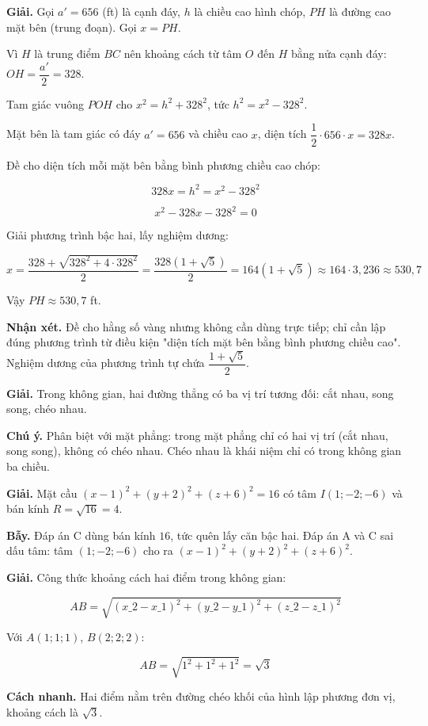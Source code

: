 \documentclass[11pt, a4paper]{article}
\begin{document}
\begin{dapan}[5 — Đáp án C]
\textbf{Giải.} Gọi $a' = 656$ (ft) là cạnh đáy, $h$ là chiều cao hình chóp, $PH$ là đường cao mặt bên (trung đoạn). Gọi $x = PH$.

Vì $H$ là trung điểm $BC$ nên khoảng cách từ tâm $O$ đến $H$ bằng nửa cạnh đáy: $OH = \dfrac{a'}{2} = 328$.

Tam giác vuông $POH$ cho $x^2 = h^2 + 328^2$, tức $h^2 = x^2 - 328^2$.

Mặt bên là tam giác có đáy $a' = 656$ và chiều cao $x$, diện tích $\dfrac{1}{2} \cdot 656 \cdot x = 328x$.

Đề cho diện tích mỗi mặt bên bằng bình phương chiều cao chóp:

$$328x = h^2 = x^2 - 328^2$$

$$x^2 - 328x - 328^2 = 0$$

Giải phương trình bậc hai, lấy nghiệm dương:

$$x = \frac{328 + \sqrt{328^2 + 4 \cdot 328^2}}{2} = \frac{328(1 + \sqrt{5})}{2} = 164(1+\sqrt{5}) \approx 164 \cdot 3{,}236 \approx 530{,}7$$

Vậy $PH \approx 530{,}7$ ft.

\textbf{Nhận xét.} Đề cho hằng số vàng nhưng không cần dùng trực tiếp; chỉ cần lập đúng phương trình từ điều kiện "diện tích mặt bên bằng bình phương chiều cao". Nghiệm dương của phương trình tự chứa $\dfrac{1+\sqrt{5}}{2}$.
\end{dapan}

\begin{dapan}[6 — Đáp án B]
\textbf{Giải.} Trong không gian, hai đường thẳng có ba vị trí tương đối: cắt nhau, song song, chéo nhau.

\textbf{Chú ý.} Phân biệt với mặt phẳng: trong mặt phẳng chỉ có hai vị trí (cắt nhau, song song), không có chéo nhau. Chéo nhau là khái niệm chỉ có trong không gian ba chiều.
\end{dapan}

\begin{dapan}[7 — Đáp án D]
\textbf{Giải.} Mặt cầu $(x-1)^2 + (y+2)^2 + (z+6)^2 = 16$ có tâm $I(1;-2;-6)$ và bán kính $R = \sqrt{16} = 4$.

\textbf{Bẫy.} Đáp án C dùng bán kính $16$, tức quên lấy căn bậc hai. Đáp án A và C sai dấu tâm: tâm $(1;-2;-6)$ cho ra $(x-1)^2 + (y+2)^2 + (z+6)^2$.
\end{dapan}

\begin{dapan}[8 — Đáp án B]
\textbf{Giải.} Công thức khoảng cách hai điểm trong không gian:

$$AB = \sqrt{(x\_2-x\_1)^2 + (y\_2-y\_1)^2 + (z\_2-z\_1)^2}$$

Với $A(1;1;1)$, $B(2;2;2)$:

$$AB = \sqrt{1^2 + 1^2 + 1^2} = \sqrt{3}$$

\textbf{Cách nhanh.} Hai điểm nằm trên đường chéo khối của hình lập phương đơn vị, khoảng cách là $\sqrt{3}$.
\end{dapan}
\end{document}
